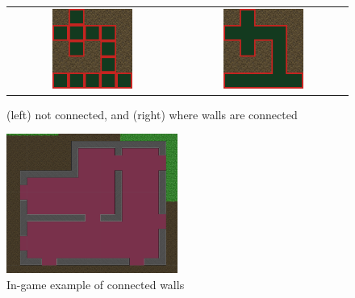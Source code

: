 \begin{figure}[H]
    \centering
    \begin{tabular}{cc}
        \includegraphics[width=0.5\textwidth]{figures/generating_levels/wall_no_border.png}
        &
        \includegraphics[width=0.5\textwidth]{figures/generating_levels/wall_with_border.png}
    \end{tabular}
    \caption{(left) not connected, and (right) where walls are connected}\label{fig:wall_comparison}
\end{figure}

\begin{figure}[H]
    \centering
    \includegraphics[width=0.5\textwidth]{figures/generating_levels/walls_ingame.png}
    \caption{In-game example of connected walls}\label{fig:walls_ingame} 
\end{figure}

